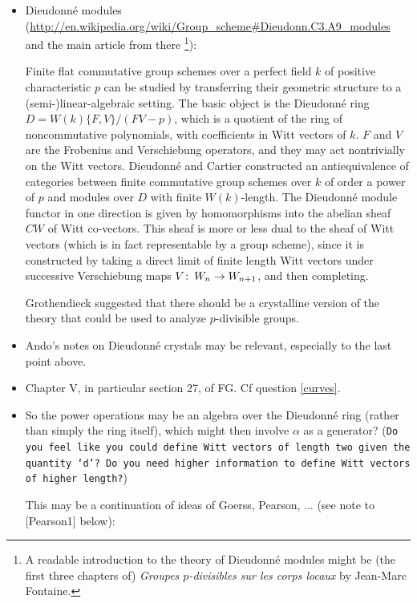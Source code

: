 \documentclass{rs}
\theoremstyle{definition}
\theoremstyle{remark}
\def\co{\colon\thinspace}
\renewcommand{\=}{\approx}
\renewcommand{\-}{\sim}
\numberwithin{equation}{section}
\numberwithin{thm}{section}
\begin{document}
\begin{itemize}
\item Dieudonn\'e modules (\url{http://en.wikipedia.org/wiki/Group_scheme#Dieudonn.C3.A9_modules} and the main article from there 
\footnote{A readable introduction to the theory of Dieudonn\'e modules might be (the first three chapters of) {\em Groupes $p$-divisibles sur les corps locaux} by Jean-Marc Fontaine.  }):

Finite flat commutative group schemes over a perfect field $k$ of positive characteristic $p$ 
can be studied by transferring their geometric structure to a (semi-)linear-algebraic setting. 
The basic object is the Dieudonn\'e ring $D = W(k)\{F,V\}/(FV - p)$, 
which is a quotient of the ring of noncommutative polynomials, 
with coefficients in Witt vectors of $k$. 
$F$ and $V$ are the Frobenius and Verschiebung operators, 
and they may act nontrivially on the Witt vectors. 
Dieudonn\'e and Cartier constructed an antiequivalence of categories 
between finite commutative group schemes over $k$ of order a power of $p$ 
and modules over $D$ with finite $W(k)$-length. 
The Dieudonn\'e module functor in one direction is given by homomorphisms into the abelian sheaf $CW$ of Witt co-vectors. 
This sheaf is more or less dual to the sheaf of Witt vectors (which is in fact representable by a group scheme), 
since it is constructed by taking a direct limit of finite length Witt vectors under successive Verschiebung maps $V\co W_n \to W_{n+1}$, and then completing.

Grothendieck suggested that there should be a crystalline version of the theory that could be used to analyze $p$-divisible groups.

\item Ando's notes on Dieudonn\'e crystals may be relevant, especially to the last point above.

\item Chapter V, in particular section 27, of FG. Cf question \eqref{curves}.

\item So the power operations may be an algebra over the Dieudonn\'e ring (rather than simply the ring itself), which might then involve $\alpha$ as a generator? 
(\texttt{Do you feel like you could define Witt vectors of length two given the quantity `$d$'? Do you need higher information to define Witt vectors of higher length?})

This may be a continuation of ideas of Goerss, Pearson, ... (see note to [Pearson1] below):


\end{itemize}
\end{document}
